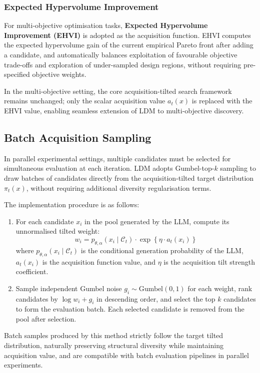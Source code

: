 \subsubsection{Expected Hypervolume Improvement}

For multi-objective optimisation tasks, \textbf{Expected Hypervolume Improvement (EHVI)} \citep{ponweiserMultiobjectiveOptimizationLimited2008} is adopted as the acquisition function. EHVI computes the expected hypervolume gain of the current empirical Pareto front after adding a candidate, and automatically balances exploitation of favourable objective trade-offs and exploration of under-sampled design regions, without requiring pre-specified objective weights.

In the multi-objective setting, the core acquisition-tilted search framework remains unchanged; only the scalar acquisition value $a_t(x)$ is replaced with the EHVI value, enabling seamless extension of LDM to multi-objective discovery.

\subsection{Batch Acquisition Sampling}
\label{sec:batch}

In parallel experimental settings, multiple candidates must be selected for simultaneous evaluation at each iteration. LDM adopts Gumbel-top-$k$ sampling to draw batches of candidates directly from the acquisition-tilted target distribution $\pi_t(x)$, without requiring additional diversity regularisation terms.

The implementation procedure is as follows:
\begin{enumerate}
  \item For each candidate $x_i$ in the pool generated by the LLM, compute its unnormalised tilted weight:
  \[
  w_i = p_{\theta,\alpha}(x_i \mid \mathcal{C}_t) \cdot \exp\left\{\eta \cdot a_t(x_i)\right\}
  \]
  where $p_{\theta,\alpha}(x_i \mid \mathcal{C}_t)$ is the conditional generation probability of the LLM, $a_t(x_i)$ is the acquisition function value, and $\eta$ is the acquisition tilt strength coefficient.

  \item Sample independent Gumbel noise $g_i \sim \text{Gumbel}(0, 1)$ for each weight, rank candidates by $\log w_i + g_i$ in descending order, and select the top $k$ candidates to form the evaluation batch. Each selected candidate is removed from the pool after selection.
\end{enumerate}

Batch samples produced by this method strictly follow the target tilted distribution, naturally preserving structural diversity while maintaining acquisition value, and are compatible with batch evaluation pipelines in parallel experiments.